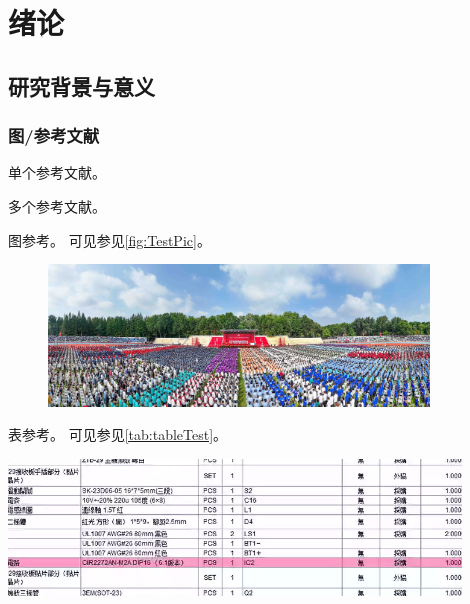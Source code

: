 \chapter{绪论}
\setcounter{page}{1}

\setlength{\parskip}{0pt}	%


\section{研究背景与意义}


\subsection{图/参考文献}


单个参考文献\cite{2024_刘巍_Article}。

多个参考文献\cite{2024_刘巍_Article,2023_刘巍_Article,2019_刘巍_Article}。



图参考。
可见参见\autoref{fig:TestPic}。
\begin{figure}[!htb]
	\centering
	\includegraphics[width=0.9\textwidth]{figures/ch1/TestPic.jpg}
	\label{fig:TestPic}
\end{figure}



表参考。
可见参见\autoref{tab:tableTest}。

\begin{table}[!htb]
	\centering
	\label{tab:tableTest}
	\includegraphics[width=0.9\textwidth]{figures/ch1/tableTest.png}
\end{table}
